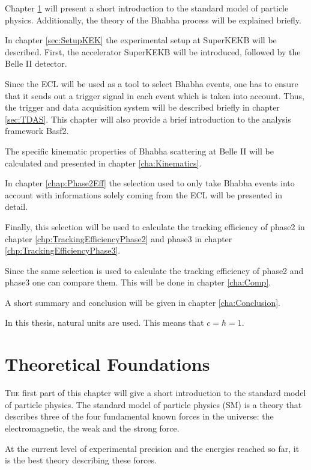 \documentclass[a4paper,11pt,twosided,final,german,openbib,pdftex,listof=totoc,bibliography=totoc]{scrbook}
\begin{document}
Chapter \ref{cha:SM} will present a short introduction to the standard model of particle physics. Additionally, the theory of the Bhabha process will be explained briefly. 

In chapter \ref{sec:SetupKEK} the experimental setup at SuperKEKB will be described. First, the accelerator SuperKEKB will be introduced, followed by the Belle II detector.

Since the ECL will be used as a tool to select Bhabha events, one has to ensure that it sends out a trigger signal in each event which is taken into account. Thus, the trigger and data acquisition system will be described briefly in chapter \ref{sec:TDAS}. This chapter will also provide a brief introduction to the analysis framework Basf2.   


The specific kinematic properties of Bhabha scattering at Belle II will be calculated and presented in chapter \ref{cha:Kinematics}.

In chapter \ref{chap:Phase2Eff} the selection used to only take Bhabha events into account with informations solely coming from the ECL will be presented in detail. 

Finally, this selection will be used to calculate the tracking efficiency of phase2 in chapter \ref{chp:TrackingEfficiencyPhase2} and phase3 in chapter \ref{chp:TrackingEfficiencyPhase3}.

Since the same selection is used to calculate the tracking efficiency of phase2 and phase3 one can compare them. This will be done in chapter \ref{cha:Comp}.

A short summary and conclusion will be given in chapter \ref{cha:Conclusion}.
\newline 

In this thesis, natural units are used. This means that $c = \hbar = 1$.
\newline


\chapter{Theoretical Foundations}
\label{cha:SM}

\lettrine{T}{he} first part of this chapter will give  a short introduction to the standard model of particle physics. The standard model of particle physics (SM) is a theory that describes three of the four fundamental known forces in the universe: the electromagnetic, the weak and the strong force. 

 At the current level of experimental precision and the energies reached so far, it is the best theory describing these forces.
 
\end{document}
